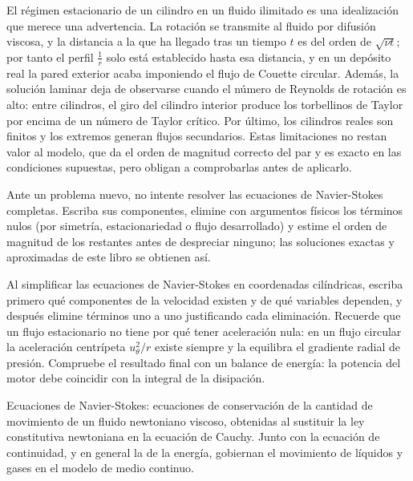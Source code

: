 \documentclass[10pt,openany]{book}
\begin{document}
El régimen estacionario de un cilindro en un fluido ilimitado es una idealización que merece una advertencia. La rotación se transmite al fluido por difusión viscosa, y la distancia a la que ha llegado tras un tiempo \(t\) es del orden de \(\sqrt{\nu t}\); por tanto el perfil \(\tfrac{1}{r}\) solo está establecido hasta esa distancia, y en un depósito real la pared exterior acaba imponiendo el flujo de Couette circular. Además, la solución laminar deja de observarse cuando el número de Reynolds de rotación es alto: entre cilindros, el giro del cilindro interior produce los torbellinos de Taylor por encima de un número de Taylor crítico. Por último, los cilindros reales son finitos y los extremos generan flujos secundarios. Estas limitaciones no restan valor al modelo, que da el orden de magnitud correcto del par y es exacto en las condiciones supuestas, pero obligan a comprobarlas antes de aplicarlo.

\begin{tcolorbox}[title={Consejo}, studiumtip, breakable]

Ante un problema nuevo, no intente resolver las ecuaciones de Navier-Stokes completas. Escriba sus componentes, elimine con argumentos físicos los términos nulos (por simetría, estacionariedad o flujo desarrollado) y estime el orden de magnitud de los restantes antes de despreciar ninguno; las soluciones exactas y aproximadas de este libro se obtienen así.

Al simplificar las ecuaciones de Navier-Stokes en coordenadas cilíndricas, escriba primero qué componentes de la velocidad existen y de qué variables dependen, y después elimine términos uno a uno justificando cada eliminación. Recuerde que un flujo estacionario no tiene por qué tener aceleración nula: en un flujo circular la aceleración centrípeta \(u_\theta^{2}/r\) existe siempre y la equilibra el gradiente radial de presión. Compruebe el resultado final con un balance de energía: la potencia del motor debe coincidir con la integral de la disipación.
\end{tcolorbox}

\begin{tcolorbox}[title={Definición}, studiumdef, breakable]

Ecuaciones de Navier-Stokes: ecuaciones de conservación de la cantidad de movimiento de un fluido newtoniano viscoso, obtenidas al sustituir la ley constitutiva newtoniana en la ecuación de Cauchy. Junto con la ecuación de continuidad, y en general la de la energía, gobiernan el movimiento de líquidos y gases en el modelo de medio continuo.
\end{tcolorbox}
\end{document}

